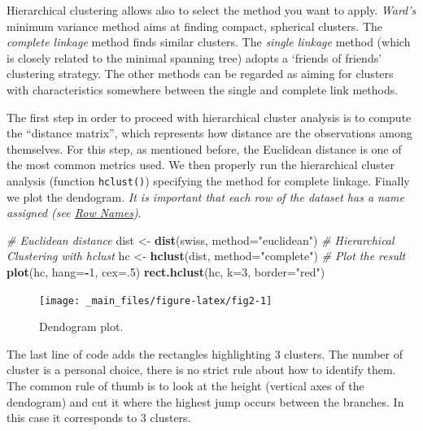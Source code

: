 \documentclass[
]{article}
\newenvironment{Shaded}{\begin{snugshade}}{\end{snugshade}}
\newcommand{\AttributeTok}[1]{\textcolor[rgb]{0.13,0.29,0.53}{#1}}
\newcommand{\CommentTok}[1]{\textcolor[rgb]{0.56,0.35,0.01}{\textit{#1}}}
\newcommand{\DecValTok}[1]{\textcolor[rgb]{0.00,0.00,0.81}{#1}}
\newcommand{\FunctionTok}[1]{\textcolor[rgb]{0.13,0.29,0.53}{\textbf{#1}}}
\newcommand{\NormalTok}[1]{#1}
\newcommand{\OtherTok}[1]{\textcolor[rgb]{0.56,0.35,0.01}{#1}}
\newcommand{\SpecialCharTok}[1]{\textcolor[rgb]{0.81,0.36,0.00}{\textbf{#1}}}
\newcommand{\StringTok}[1]{\textcolor[rgb]{0.31,0.60,0.02}{#1}}
\begin{document}
Hierarchical clustering allows also to select the method you want to
apply. \emph{Ward's} minimum variance method aims at finding compact,
spherical clusters. The \emph{complete linkage} method finds similar
clusters. The \emph{single linkage} method (which is closely related to the
minimal spanning tree) adopts a `friends of friends' clustering
strategy. The other methods can be regarded as aiming for clusters with
characteristics somewhere between the single and complete link methods.

The first step in order to proceed with hierarchical cluster analysis is
to compute the ``distance matrix'', which represents how distance are the
observations among themselves. For this step, as mentioned before, the
Euclidean distance is one of the most common metrics used. We then
properly run the hierarchical cluster analysis (function \texttt{hclust()})
specifying the method for complete linkage. Finally we plot the
dendogram. \emph{It is important that each row of the dataset has a name
assigned (see \protect\hyperlink{row-names}{Row Names})}.

\begin{Shaded}
\begin{Highlighting}[]
\CommentTok{\# Euclidean distance}
\NormalTok{dist }\OtherTok{\textless{}{-}} \FunctionTok{dist}\NormalTok{(swiss, }\AttributeTok{method=}\StringTok{"euclidean"}\NormalTok{)}
\CommentTok{\# Hierarchical Clustering with hclust}
\NormalTok{hc }\OtherTok{\textless{}{-}} \FunctionTok{hclust}\NormalTok{(dist, }\AttributeTok{method=}\StringTok{"complete"}\NormalTok{)}
\CommentTok{\# Plot the result}
\FunctionTok{plot}\NormalTok{(hc, }\AttributeTok{hang=}\SpecialCharTok{{-}}\DecValTok{1}\NormalTok{, }\AttributeTok{cex=}\NormalTok{.}\DecValTok{5}\NormalTok{)}
\FunctionTok{rect.hclust}\NormalTok{(hc, }\AttributeTok{k=}\DecValTok{3}\NormalTok{, }\AttributeTok{border=}\StringTok{"red"}\NormalTok{)}
\end{Highlighting}
\end{Shaded}

\begin{figure}[H]
\texttt{[image: \_main\_files/figure-latex/fig2-1]} \caption{Dendogram plot.}\label{fig:fig2}
\end{figure}

The last line of code adds the rectangles highlighting 3 clusters. The
number of cluster is a personal choice, there is no strict rule about
how to identify them. The common rule of thumb is to look at the height
(vertical axes of the dendogram) and cut it where the highest jump
occurs between the branches. In this case it corresponds to 3 clusters.
\end{document}
